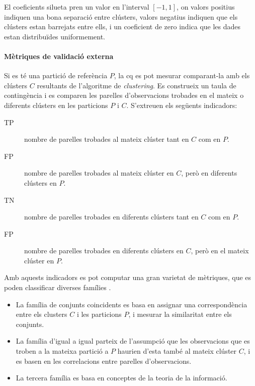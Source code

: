 \documentclass[CAT,BIB]{TFUOC}%
\begin{document}
            El coeficients silueta pren un valor en l'interval $[-1, 1]$,
            on valors positius indiquen una bona separació entre clústers,
            valors negatius indiquen que els clústers estan barrejats entre ells,
            i un coeficient de zero indica que les dades estan distribuïdes uniformement.

        \paragraph{Mètriques de validació externa}
            Si es té una partició de referència $P$,
            la \gls{cq} es pot mesurar comparant-la
            amb els clústers $C$ resultants de l'algoritme de \textit{clustering}.
            Es construeix un taula de contingència
            i es comparen les parelles d'observacions
            trobades en el mateix o diferents clústers
            en les particions $P$ i $C$.
            S'extreuen els següents indicadors:
            \begin{description}
                \item[TP]
                nombre de parelles trobades al mateix clúster
                tant en $C$ com en $P$.

                \item[FP] nombre de parelles trobades al mateix clúster en $C$,
                però en diferents clústers en $P$.

                \item[TN] nombre de parelles trobades en diferents clústers
                tant en $C$ com en $P$.

                \item[FP] nombre de parelles trobades en diferents clústers en $C$,
                però en el mateix clúster en $P$.
            \end{description}

            Amb aquests indicadors
            es pot computar una gran varietat de mètriques,
            que es poden classificar diverses famílies \citep{Palacio-Nino2019}.
            \begin{itemize}
                \item La família de conjunts coincidents
                es basa en assignar una correspondència
                entre els clusters $C$ i les particions $P$,
                i mesurar la similaritat entre els conjunts.

                \item La família d'igual a igual parteix de l'assumpció
                que les observacions que es troben a la mateixa partició a $P$
                haurien d'esta també al mateix clúster $C$,
                i es basen en les correlacions entre parelles d'observacions.

                \item La tercera família es basa
                en conceptes de la teoria de la informació.
            \end{itemize}
\end{document}
